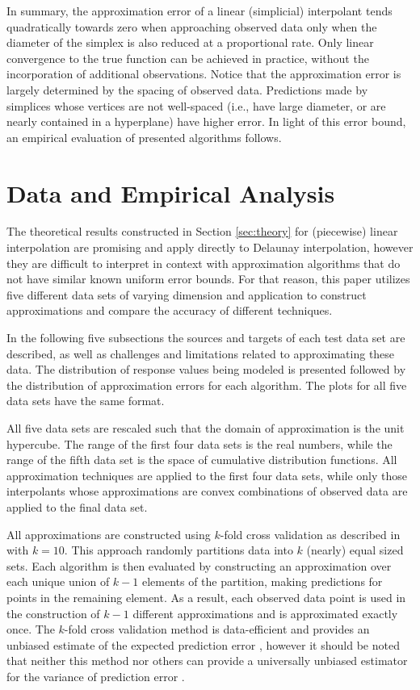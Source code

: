 \documentclass[smallextended,final]{svjour3}  %
\begin{document}
In summary, the approximation error of a linear (simplicial)
interpolant tends quadratically towards zero when approaching observed
data only when the diameter of the simplex is also reduced at a
proportional rate.  Only linear convergence to the true function can
be achieved in practice, without the incorporation of additional
observations. Notice that the approximation error is largely
determined by the spacing of observed data. Predictions made by
simplices whose vertices are not well-spaced (i.e., have large
diameter, or are nearly contained in a hyperplane) have higher
error. In light of this error bound, an empirical evaluation of
presented algorithms follows.

\vspace{-2mm}
\section{Data and Empirical Analysis}
\label{sec:data}

The theoretical results constructed in Section \ref{sec:theory} for
(piecewise) linear interpolation are promising and apply directly to
Delaunay interpolation, however they are difficult to interpret in
context with approximation algorithms that do not have similar known
uniform error bounds. For that reason, this paper utilizes five
different data sets of varying dimension and application to construct
approximations and compare the accuracy of different techniques.

In the following five subsections the sources and targets of each test
data set are described, as well as challenges and limitations related
to approximating these data. The distribution of response values being
modeled is presented followed by the distribution of approximation
errors for each algorithm. The plots for all five data sets have the
same format.

All five data sets are rescaled such that the domain of approximation
is the unit hypercube. The range of the first four data sets is the
real numbers, while the range of the fifth data set is the space of
cumulative distribution functions. All approximation techniques are
applied to the first four data sets, while only those interpolants
whose approximations are convex combinations of observed data are
applied to the final data set.

All approximations are constructed using $k$-fold cross validation as
described in \cite{kohavi1995study} with $k=10$. This approach
randomly partitions data into $k$ (nearly) equal sized sets. Each
algorithm is then evaluated by constructing an approximation over each
unique union of $k-1$ elements of the partition, making predictions
for points in the remaining element. As a result, each observed data
point is used in the construction of $k-1$ different approximations
and is approximated exactly once. The $k$-fold cross validation method
is data-efficient and provides an unbiased estimate of the expected
prediction error \cite{kohavi1995study}, however it should be noted
that neither this method nor others can provide a universally unbiased
estimator for the variance of prediction error \cite{bengio2004no}.
\end{document}
